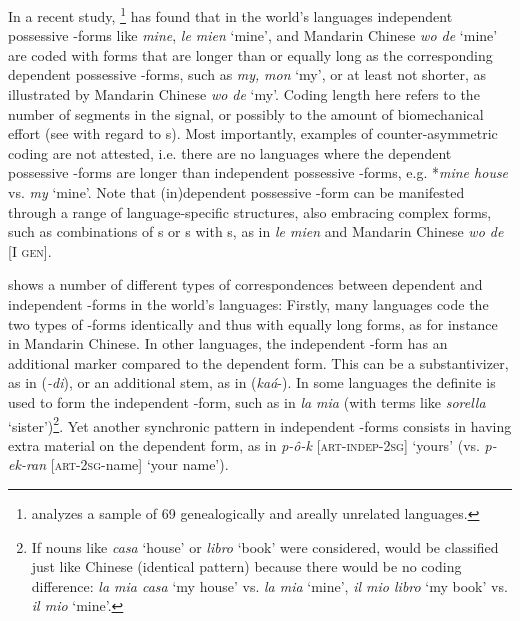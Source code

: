 \documentclass[output=paper]{langsci/langscibook}
\begin{document}
In a recent study, \citet{Ye2017}{\-}\footnote{\citet{Ye2017} analyzes a sample of 69 genealogically and areally unrelated languages.} has found that in the world's languages independent possessive -forms like  \textit{mine},  \textit{le mien} ‘mine’, and Mandarin  Chinese \textit{wo de} ‘mine’ are coded with forms that are longer than or equally long as the corresponding dependent possessive -forms, such as  \textit{my,}  \textit{mon} ‘my’, or at least not shorter, as illustrated by Mandarin  Chinese \textit{wo de} ‘my’. Coding length here refers to the number of segments in the signal, or possibly to the amount of biomechanical effort (see \citealt{NapoliEtAl2014} with regard to s). Most importantly, examples of counter-asymmetric coding are not attested, i.e. there are no languages where the dependent possessive -forms are longer than independent possessive -forms, e.g. *\textit{mine house} vs. \textit{my} ‘mine’. Note that (in)dependent possessive -form can be manifested through a range of language-specific structures, also embracing complex forms, such as combinations of s or s with s, as in  \textit{le mien} and Mandarin  Chinese \textit{wo de} [I \textsc{gen}]. 

 shows a number of different types of correspondences between dependent and independent -forms in the world's languages: Firstly, many languages code the two types of -forms identically and thus with equally long forms, as for instance in Mandarin  Chinese. In other languages, the independent -form has an additional marker compared to the dependent form. This can be a substantivizer, as in  (\textit{{}-di}), or an additional stem, as in  (\textit{kaá}{}-). In some languages the definite  is used to form the independent -form, such as in  \textit{la mia} (with  terms like \textit{sorella} ‘sister’)\footnote{If nouns like \textit{casa} ‘house’ or \textit{libro} ‘book’ were considered,  would be classified just like Chinese  (identical pattern) because there would be no coding difference: \textit{la mia casa} ‘my house’ vs. \textit{la mia} ‘mine’, \textit{il mio libro} ‘my book’ vs. \textit{il mio} ‘mine’.}. Yet another synchronic pattern in independent -forms consists in having extra material on the dependent form, as in  \textit{p-ô-k} [\textsc{art-indep-2sg}] ‘yours’ (vs. \textit{p-ek-ran} [\textsc{art-2sg}{}-name] ‘your name’).
\end{document}
